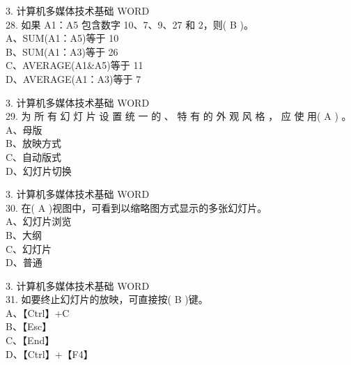 \documentclass[aspectratio=169]{beamer}
\begin{document}
\begin{frame}[t]{3. 计算机多媒体技术基础} \vspace{20pt}
    WORD\\

28. 如果 A1：A5 包含数字 10、7、9、27 和 2，则( B )。\\
A、SUM(A1：A5)等于 10\\
B、SUM(A1：A3)等于 26\\
C、AVERAGE(A1\&A5)等于 11\\
D、AVERAGE(A1：A3)等于 7\\

\end{frame}



\begin{frame}[t]{3. 计算机多媒体技术基础} \vspace{20pt}
    WORD\\


29. 为 所 有 幻 灯 片 设 置 统 一 的 、 特 有 的 外 观 风 格 ， 应 使 用( A ) 。\\
A、母版\\ B、放映方式\\ C、自动版式\\ D、幻灯片切换\\

\end{frame}

\begin{frame}[t]{3. 计算机多媒体技术基础} \vspace{20pt}
    WORD\\

30. 在( A )视图中，可看到以缩略图方式显示的多张幻灯片。\\
A、幻灯片浏览\\ B、大纲\\ C、幻灯片\\ D、普通\\

\end{frame}


\begin{frame}[t]{3. 计算机多媒体技术基础} \vspace{20pt}
    WORD\\


31. 如要终止幻灯片的放映，可直接按( B )键。\\
A、【Ctrl】+C\\ B、【Esc】\\
C、【End】\\ D、【Ctrl】+【F4】\\

\end{frame}
\end{document}
